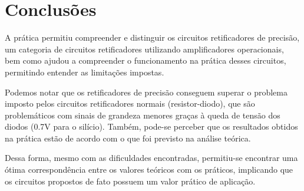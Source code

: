 \section{Conclusões}

A prática permitiu compreender e distinguir os circuitos retificadores de precisão, um categoria de circuitos retificadores utilizando amplificadores operacionais, bem como ajudou a compreender o funcionamento na prática desses circuitos, permitindo entender as limitações impostas.

Podemos notar que os retificadores de precisão conseguem superar o problema imposto pelos circuitos retificadores normais (resistor-diodo), que são problemáticos com
sinais de grandeza menores graças à queda de tensão dos diodos (0.7V para o silício). Também, pode-se perceber que os resultados obtidos na prática estão de acordo com o que foi previsto na análise teórica.

Dessa forma, mesmo com as dificuldades encontradas, permitiu-se encontrar uma ótima correspondência entre os valores teóricos com os práticos, implicando que os circuitos propostos de fato possuem um valor prático de aplicação.


